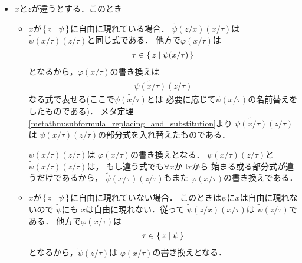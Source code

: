 \begin{metaprf}[第一]
\begin{description}
\begin{description}
\begin{itemize}
							\item $x$と$z$が違うとする．このとき
								\begin{itemize}
									\item $x$が$\{\, z \mid \psi\, \}$に自由に現れている場合．
										$\widetilde{\psi}(z/x)(x/\tau)$は
										$\widetilde{\psi}(x/\tau)(z/\tau)$と同じ式である．
										他方で$\varphi(x/\tau)$は
										\begin{align}
											\tau \in \{\, z \mid \psi(x/\tau)\, \}
										\end{align}
										となるから，$\varphi(x/\tau)$の書き換えは
										\begin{align}
											\widetilde{\psi(x/\tau)}(z/\tau)
										\end{align}
										なる式で表せる(ここで$\widetilde{\psi(x/\tau)}$とは
										必要に応じて$\psi(x/\tau)$の名前替えをしたものである)．
										メタ定理\ref{metathm:subformula_replacing_and_substitution}より
										$\widetilde{\psi(x/\tau)}(z/\tau)$は
										$\psi(x/\tau)(z/\tau)$の部分式を入れ替えたものである．
										
										$\psi(x/\tau)(z/\tau)$は
										$\varphi(x/\tau)$の書き換えとなる．
										$\psi(x/\tau)(z/\tau)$と
										$\widetilde{\psi}(x/\tau)(z/\tau)$は，
										もし違う式でも$\forall x$か$\exists x$から
										始まる或る部分式が違うだけであるから，
										$\widetilde{\psi}(x/\tau)(z/\tau)$もまた
										$\varphi(x/\tau)$の書き換えである．
										
									\item $x$が$\{\, z \mid \psi\, \}$に自由に現れていない場合．
										このときは$\psi$に$x$は自由に現れないので
										$\widetilde{\psi}$にも
										$x$は自由に現れない．従って
										$\widetilde{\psi}(z/x)(x/\tau)$は
										$\widetilde{\psi}(z/\tau)$である．
										他方で$\varphi(x/\tau)$は
										\begin{align}
											\tau \in \{\, z \mid \psi\, \}
										\end{align}
										となるから，$\widetilde{\psi}(z/\tau)$は
										$\varphi(x/\tau)$の書き換えとなる．
								\end{itemize}
						\end{itemize}
						

\end{description}
\end{description}
\end{metaprf}
